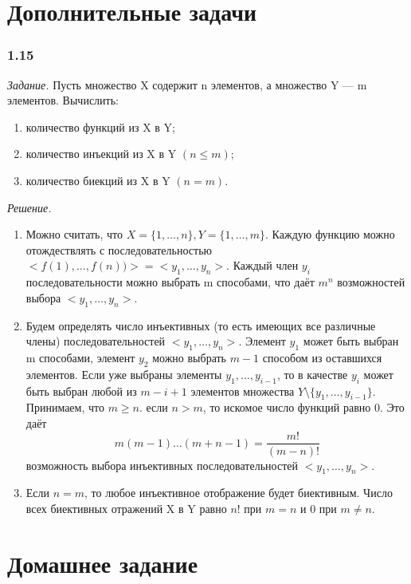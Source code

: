 \section*{Дополнительные задачи}

\subsubsection*{1.15}

\textit{Задание.} Пусть множество X содержит n элементов, а множество Y --- m элементов.
Вычислить:
\begin{enumerate}[label=\alph*)]
\item количество функций из X в Y;
\item количество инъекций из X в Y $\left(n\leq m\right)$;
\item количество биекций из X в Y $\left(n=m\right)$.
\end{enumerate}

\textit{Решение.}
\begin{enumerate}[label=\alph*)]
\item Можно считать, что $ X = \{1,  \dotsc , n \}, Y = \{1,  \dotsc , m \}$.
Каждую функцию можно отождествлять с последовательностью $ < f(1),  \dotsc , f(n) ) > = < y_1,  \dotsc , y_n > $.
Каждый член $y_i$ последовательности можно выбрать m способами, что даёт $m^n$ возможностей выбора $ < y_1,  \dotsc , y_n > $.

\item Будем определять число инъективных (то есть имеющих все различные члены) последовательностей $ < y_1,  \dotsc , y_n > $.
Элемент $y_1$ может быть выбран m способами, элемент $y_2$ можно выбрать $m-1$ способом из оставшихся элементов.
Если уже выбраны элементы $ y_1,  \dotsc , y_{i-1} $,
то в качестве $y_i$ может быть выбран любой из $m-i+1$ элементов множества
$Y\setminus\{y_1,  \dotsc , y_{i-1}\}$. Принимаем, что $ m \geq n $. если $ n > m $,
то искомое число функций равно 0.
Это даёт
$$m\left(m-1\right) \dotsc (m+n-1)
=\frac{m!}{\left(m-n\right)!}$$
возможность выбора инъективных последовательностей $<y_1,  \dotsc , y_n>$.

\item Если $n=m$, то любое инъективное отображение будет биективным.
Число всех биективных отражений X в Y равно $n!$ при $m = n$ и 0 при $m \neq n$.
\end{enumerate}

\section*{Домашнее задание}

